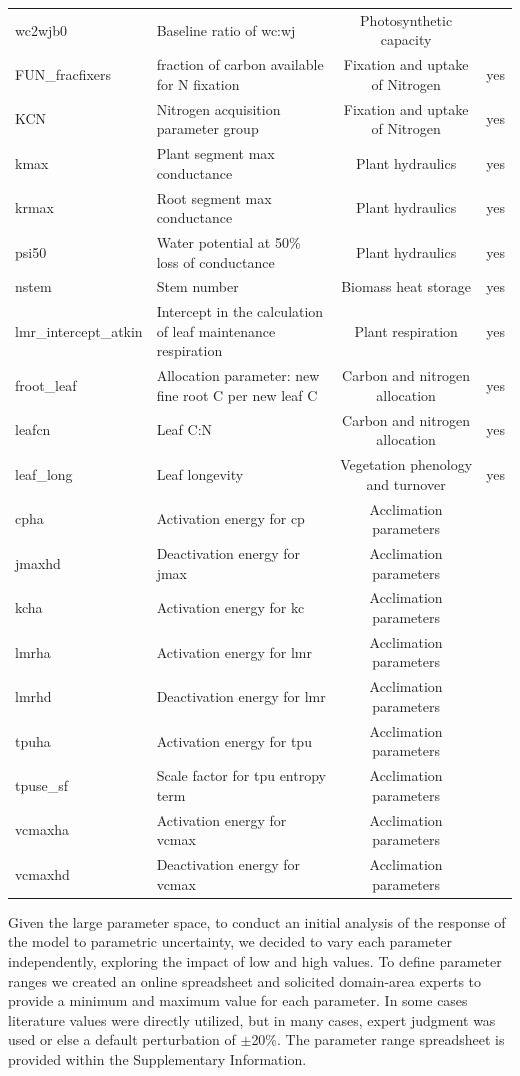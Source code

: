 \documentclass[draft]{agujournal2019}
\begin{document}
\begin{landscape}
\begin{table}[h]
\begin{tabular}{l l c c}
wc2wjb0 & Baseline ratio of wc:wj & Photosynthetic capacity &\\
FUN\_fracfixers & fraction of carbon available for N fixation & Fixation and uptake of Nitrogen &yes\\
KCN & Nitrogen acquisition parameter group & Fixation and uptake of Nitrogen &yes\\
kmax & Plant segment max conductance & Plant hydraulics &yes\\
krmax & Root segment max conductance & Plant hydraulics &yes\\
psi50 & Water potential at 50\% loss of conductance & Plant hydraulics &yes\\
nstem & Stem number & Biomass heat storage &yes\\
lmr\_intercept\_atkin & Intercept in the calculation of leaf maintenance respiration& Plant respiration &yes\\
froot\_leaf & Allocation parameter: new fine root C per new leaf C & Carbon and nitrogen allocation &yes\\
leafcn & Leaf C:N & Carbon and nitrogen allocation &yes\\
leaf\_long & Leaf longevity & Vegetation phenology and turnover &yes\\
cpha & Activation energy for cp & Acclimation parameters &\\
jmaxhd & Deactivation energy for jmax & Acclimation parameters &\\
kcha & Activation energy for kc & Acclimation parameters &\\
lmrha & Activation energy for lmr & Acclimation parameters &\\
lmrhd & Deactivation energy for lmr & Acclimation parameters &\\
tpuha & Activation energy for tpu & Acclimation parameters &\\
tpuse\_sf & Scale factor for tpu entropy term & Acclimation parameters &\\
vcmaxha & Activation energy for vcmax & Acclimation parameters &\\
vcmaxhd & Deactivation energy for vcmax & Acclimation parameters &\\
 \hline
 \end{tabular}
 \end{table}
\end{landscape}

Given the large parameter space, to conduct an initial analysis of the response of the model to parametric uncertainty, we decided to vary each parameter independently, exploring the impact of low and high values. To define parameter ranges we created an online spreadsheet and solicited domain-area experts to provide a minimum and maximum value for each parameter. In some cases literature values were directly utilized, but in many cases, expert judgment was used or else a default perturbation of $\pm$20\%. The parameter range spreadsheet is provided within the Supplementary Information. 
\end{document}
